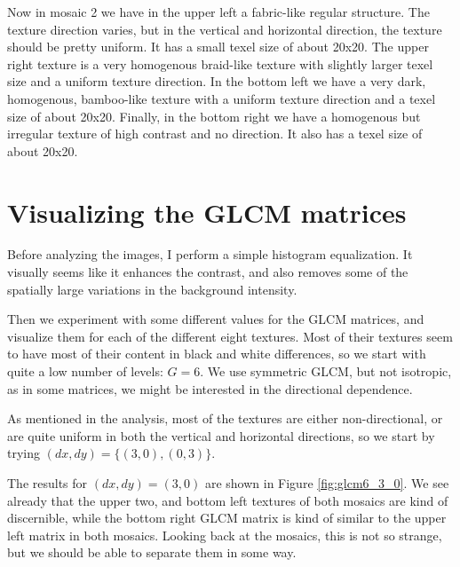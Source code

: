 \documentclass[a4paper]{article}
\begin{document}
Now in mosaic 2 we have in the upper left a fabric-like regular
structure. The texture direction varies, but in the vertical and
horizontal direction, the texture should be pretty uniform. It has a
small texel size of about 20x20. The upper right texture is a very
homogenous braid-like texture with slightly larger texel size and a
uniform texture direction. In the bottom left we have a very dark,
homogenous, bamboo-like texture with a uniform texture direction and a
texel size of about 20x20. Finally, in the bottom right we have a
homogenous but irregular texture of high contrast and no direction. It
also has a texel size of about 20x20.

\section{Visualizing the GLCM matrices}

Before analyzing the images, I perform a simple histogram equalization.
It visually seems like it enhances the contrast, and also removes some
of the spatially large variations in the background intensity. 

Then we experiment with some different values for the GLCM matrices, and
visualize them for each of the different eight textures. Most of their
textures seem to have most of their content in black and white
differences, so we start with quite a low number of levels: $G = 6$. We
use symmetric GLCM, but not isotropic, as in some matrices, we might be
interested in the directional dependence.

As mentioned in the analysis, most of the textures are either
non-directional, or are quite uniform in both the vertical and
horizontal directions, so we start by trying $(dx, dy) = \{(3, 0), (0,
3)\}$.

The results for $(dx, dy) = (3, 0)$ are shown in Figure
\ref{fig:glcm6_3_0}. We see already that the upper two, and bottom left
textures of both mosaics are kind of discernible, while the bottom right
GLCM matrix is kind of similar to the upper left matrix in both mosaics.
Looking back at the mosaics, this is not so strange, but we should be
able to separate them in some way.
\end{document}
